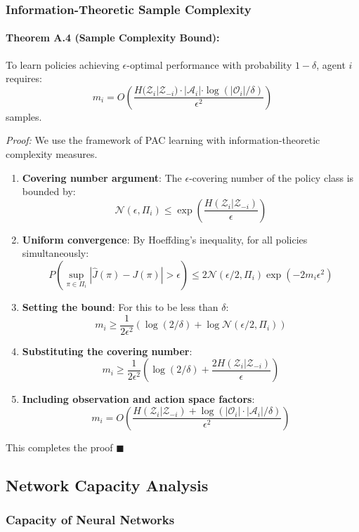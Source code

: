 \documentclass[10pt, letterpaper]{article}
\begin{document}
\subsubsection{Information-Theoretic Sample Complexity}

\paragraph{Theorem A.4 (Sample Complexity Bound):} To learn policies achieving $\epsilon$-optimal performance with probability $1-\delta$, agent $i$ requires:
\[m_i = O\left( \frac{H(\mathcal{Z}_i | \mathcal{Z}_{-i}) \cdot |\mathcal{A}_i| \cdot \log(|\mathcal{O}_i|/\delta)}{\epsilon^2} \right)\]
samples.

\emph{Proof:} We use the framework of PAC learning with information-theoretic complexity measures.
\begin{enumerate}
    \item \textbf{Covering number argument}: The $\epsilon$-covering number of the policy class is bounded by:
    \[\mathcal{N}(\epsilon, \Pi_i) \leq \exp\left( \frac{H(\mathcal{Z}_i | \mathcal{Z}_{-i})}{\epsilon} \right)\]
    \item \textbf{Uniform convergence}: By Hoeffding's inequality, for all policies simultaneously:
    \[P\left( \sup_{\pi \in \Pi_i} |\hat{J}(\pi) - J(\pi)| > \epsilon \right) \leq 2\mathcal{N}(\epsilon/2, \Pi_i) \exp(-2m_i\epsilon^2)\]
    \item \textbf{Setting the bound}: For this to be less than $\delta$:
    \[m_i \geq \frac{1}{2\epsilon^2} \left( \log(2/\delta) + \log \mathcal{N}(\epsilon/2, \Pi_i) \right)\]
    \item \textbf{Substituting the covering number}:
    \[m_i \geq \frac{1}{2\epsilon^2} \left( \log(2/\delta) + \frac{2H(\mathcal{Z}_i | \mathcal{Z}_{-i})}{\epsilon} \right)\]
    \item \textbf{Including observation and action space factors}:
    \[m_i = O\left( \frac{H(\mathcal{Z}_i | \mathcal{Z}_{-i}) + \log(|\mathcal{O}_i| \cdot |\mathcal{A}_i| / \delta)}{\epsilon^2} \right)\]
\end{enumerate}
This completes the proof $\blacksquare$

\subsection{Network Capacity Analysis}

\subsubsection{Capacity of Neural Networks}
\end{document}
